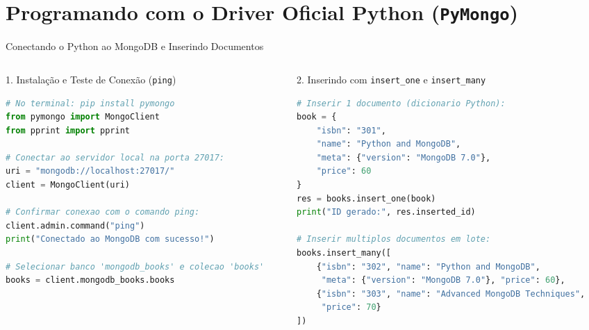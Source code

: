 \section[CRUD com Python (PyMongo)]{Programando com o Driver Oficial Python (\texttt{PyMongo})}

\begin{frame}[fragile]{Conectando o Python ao MongoDB e Inserindo Documentos}
  \vspace{0.05cm}
  \begin{columns}[t]
    \begin{column}{0.48\textwidth}
      \alert{1. Instalação e Teste de Conexão (\texttt{ping})}\par
      \begin{lstlisting}[language=Python]
# No terminal: pip install pymongo
from pymongo import MongoClient
from pprint import pprint

# Conectar ao servidor local na porta 27017:
uri = "mongodb://localhost:27017/"
client = MongoClient(uri)

# Confirmar conexao com o comando ping:
client.admin.command("ping")
print("Conectado ao MongoDB com sucesso!")

# Selecionar banco 'mongodb_books' e colecao 'books'
books = client.mongodb_books.books
      \end{lstlisting}
    \end{column}
    \begin{column}{0.48\textwidth}
      \alert{2. Inserindo com \texttt{insert\_one} e \texttt{insert\_many}}\par
      \begin{lstlisting}[language=Python]
# Inserir 1 documento (dicionario Python):
book = {
    "isbn": "301",
    "name": "Python and MongoDB",
    "meta": {"version": "MongoDB 7.0"},
    "price": 60
}
res = books.insert_one(book)
print("ID gerado:", res.inserted_id)

# Inserir multiplos documentos em lote:
books.insert_many([
    {"isbn": "302", "name": "Python and MongoDB",
     "meta": {"version": "MongoDB 7.0"}, "price": 60},
    {"isbn": "303", "name": "Advanced MongoDB Techniques",
     "price": 70}
])
      \end{lstlisting}
    \end{column}
  \end{columns}
\end{frame}

